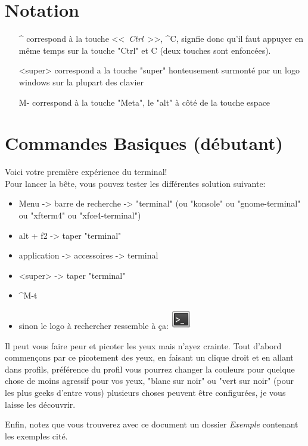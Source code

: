 \documentclass[french, a4paper, 12pt, titlepage]{article}
\begin{document}
\section{Notation}
\begin{enumerate}
\item[\^{}] correspond à la touche <<~\emph{Ctrl}~>>, \^{}C, signfie donc qu'il faut appuyer en même temps sur la touche "Ctrl" et C (deux touches sont enfoncées).
\item [<super>] correspond a la touche "super" honteusement surmonté par un logo windows sur la plupart des clavier
\item [M-] correspond à la touche "Meta", le "alt" à côté de la touche espace
\end{enumerate}

\section{Commandes Basiques (débutant)}
\noindent Voici votre première expérience du terminal!\\
Pour lancer la bête, vous pouvez tester les différentes solution suivante:
\begin{itemize}
\item Menu -> barre de recherche -> "terminal" (ou "konsole" ou "gnome-terminal" ou "xfterm4" ou "xfce4-terminal")
\item alt + f2 -> taper "terminal"
\item application -> accessoires -> terminal
\item <super>  -> taper "terminal"
\item \^{}M-t
\item sinon le logo à rechercher ressemble à ça:  \includegraphics[scale=0.7]{Images/termIcon}
\end{itemize}
Il peut vous faire peur et picoter les yeux mais n'ayez crainte. Tout d'abord commençons par ce picotement des yeux, en faisant un clique droit et en allant dans profils, préférence du profil vous pourrez changer la couleurs pour quelque chose de moins agressif pour vos yeux, "blanc sur noir" ou "vert sur noir" (pour les plus geeks d'entre vous) plusieurs choses peuvent être configurées, je vous laisse les découvrir.

Enfin, notez que vous trouverez avec ce document un dossier \emph{Exemple} contenant les exemples cité.
\end{document}
